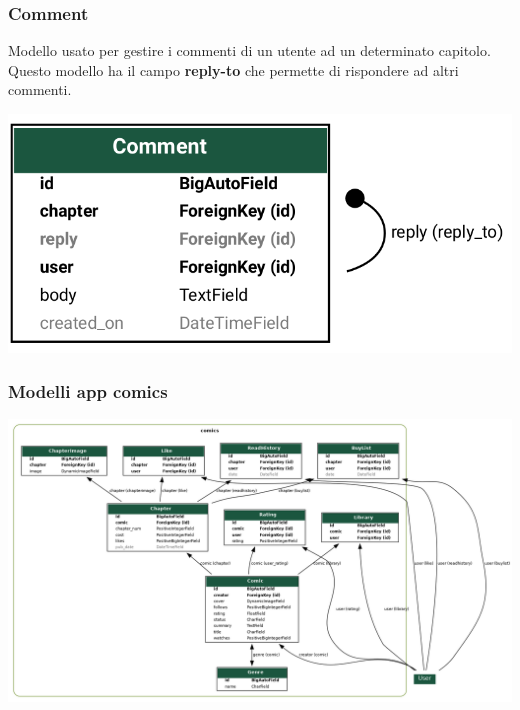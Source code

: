 \subsubsection{Comment}
Modello usato per gestire i commenti di un utente ad un determinato capitolo.
Questo modello ha il campo \textbf{reply-to} che permette di rispondere ad altri commenti.

\begin{center}
  \includegraphics[width=0.4\linewidth]{images/comment.png}
\end{center}


\subsubsection{Modelli app comics}
\begin{center}
  \includegraphics[width=1.0\linewidth]{images/comics.png}
\end{center}

